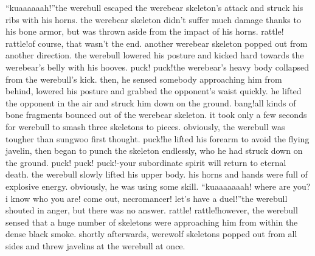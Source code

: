 “kuaaaaaah!”the werebull escaped the werebear skeleton’s attack and struck his ribs with his horns.
 the werebear skeleton didn’t suffer much damage thanks to his bone armor, but was thrown aside from the impact of his horns.
rattle! rattle!of course, that wasn’t the end.
 another werebear skeleton popped out from another direction.
 the werebull lowered his posture and kicked hard towards the werebear’s belly with his hooves.
puck! puck!the werebear’s heavy body collapsed from the werebull’s kick.
 then, he sensed somebody approaching him from behind, lowered his posture and grabbed the opponent’s waist quickly.
 he lifted the opponent in the air and struck him down on the ground.
bang!all kinds of bone fragments bounced out of the werebear skeleton.
it took only a few seconds for werebull to smash three skeletons to pieces.
obviously, the werebull was tougher than sungwoo first thought.
puck!he lifted his forearm to avoid the flying javelin, then began to punch the skeleton endlessly, who he had struck down on the ground.
puck! puck! puck!-your subordinate spirit will return to eternal death.
the werebull slowly lifted his upper body.
 his horns and hands were full of explosive energy.
obviously, he was using some skill.
“kuaaaaaaah! where are you? i know who you are! come out, necromancer! let’s have a duel!”the werebull shouted in anger, but there was no answer.
rattle! rattle!however, the werebull sensed that a huge number of skeletons were approaching him from within the dense black smoke.
shortly afterwards, werewolf skeletons popped out from all sides and threw javelins at the werebull at once.


